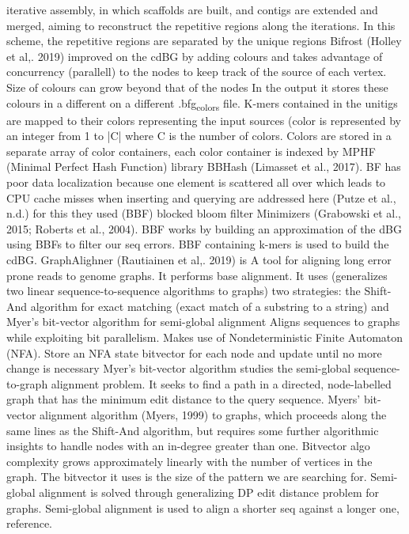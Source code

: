\documentclass[11pt]{article}
\begin{document}
iterative assembly, in which scaffolds are built, and contigs are extended and merged, aiming to reconstruct the repetitive regions along the iterations.
In this scheme, the repetitive regions are separated by the unique regions
Bifrost (Holley et al,. 2019) improved on the cdBG by adding colours and takes advantage of concurrency (parallell) to the nodes to keep track of the source of each vertex. Size of colours can grow beyond that of the nodes In the output it stores these colours in a different on a different .bfg\textsubscript{colors} file. K-mers contained in the unitigs are mapped to their colors representing the input sources (color is represented by an integer from 1 to |C| where C is the number of colors. Colors are stored in a separate array of color containers, each color container is indexed by MPHF (Minimal Perfect Hash Function) library BBHash (Limasset et al., 2017).
BF has poor data localization because one element is scattered all over which leads to CPU cache misses when inserting and querying are addressed here  (Putze et al., n.d.) for this they used (BBF) blocked bloom filter Minimizers (Grabowski et al., 2015; Roberts et al., 2004).
BBF works by building an approximation of the dBG using BBFs to filter our seq errors. BBF containing k-mers is used to build the cdBG.
GraphAlighner (Rautiainen et al,. 2019) is A tool for aligning long error prone reads to genome graphs. It performs base alignment. It uses (generalizes two linear sequence-to-sequence algorithms to graphs) two strategies: the Shift-And algorithm for exact matching (exact match of a substring to a string) and Myer’s bit-vector algorithm for semi-global alignment
Aligns sequences to graphs while exploiting bit parallelism. Makes use of Nondeterministic Finite Automaton (NFA). Store an NFA state bitvector for each node and update until no more change is necessary
Myer’s bit-vector algorithm studies the semi-global sequence-to-graph alignment problem. It seeks to find a path in a directed, node-labelled graph that has the minimum edit distance to the query sequence. Myers’ bit-vector alignment algorithm (Myers, 1999) to graphs, which proceeds along the same lines as the Shift-And algorithm, but requires some further algorithmic insights to handle nodes with an in-degree greater than one. Bitvector algo complexity grows approximately linearly with the number of vertices in the graph. The bitvector it uses is the size of the pattern we are searching for. Semi-global alignment is solved through generalizing DP edit distance problem for graphs. Semi-global alignment is used to align a shorter seq against a longer one, reference.
\end{document}
